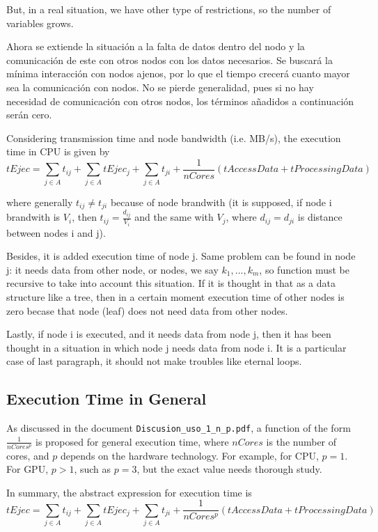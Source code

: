 \documentclass{article}
\begin{document}
But, in a real situation, we have other type of restrictions, so the number of variables grows.

Ahora se extiende la situación a la falta de datos dentro del nodo y la comunicación de este con otros nodos con los datos necesarios. Se buscará la mínima interacción con nodos ajenos, por lo que el tiempo crecerá cuanto mayor sea la comunicación con nodos. No se pierde generalidad, pues si no hay necesidad de comunicación con otros nodos, los términos añadidos a continuación serán cero.

Considering transmission time and node bandwidth (i.e. MB/s), the execution time in CPU is given by
\[
tEjec = \sum_{j \in A} t_{ij} + \sum_{j \in A} tEjec_j + \sum_{j \in A} t_{ji} + \frac{1}{nCores}(tAccessData + tProcessingData)
\]

where generally \(t_{ij} \neq t_{ji}\) because of node brandwith (it is supposed, if node i brandwith is \(V_i\), then \(t_{ij}=\frac{d_{ij}}{V_i}\) and the same with \(V_j\), where \(d_{ij}=d_{ji}\) is distance between nodes i and j).

Besides, it is added execution time of node j. Same problem can be found in node j: it needs data from other node, or nodes, we say \(k_1,...,k_m\), so function must be recursive to take into account this situation. If it is thought in that as a data structure like a tree, then in a certain moment execution time of other nodes is zero becase that node (leaf) does not need data from other nodes.

Lastly, if node i is executed, and it needs data from node j, then it has been thought in a situation in which node j needs data from node i. It is a particular case of last paragraph, it should not make troubles like eternal loops.

\subsection{Execution Time in General}

As discussed in the document \texttt{Discusion\_uso\_1\_n\_p.pdf}, a function of the form $\frac{1}{nCores^p}$ is proposed for general execution time, where $nCores$ is the number of cores, and $p$ depends on the hardware technology. For example, for CPU, $p=1$. For GPU, $p>1$, such as $p=3$, but the exact value needs thorough study.

In summary, the abstract expression for execution time is
\[
tEjec = \sum_{j \in A} t_{ij} + \sum_{j \in A} tEjec_j + \sum_{j \in A} t_{ji} + \frac{1}{nCores^p}(tAccessData + tProcessingData)
\]
\end{document}

